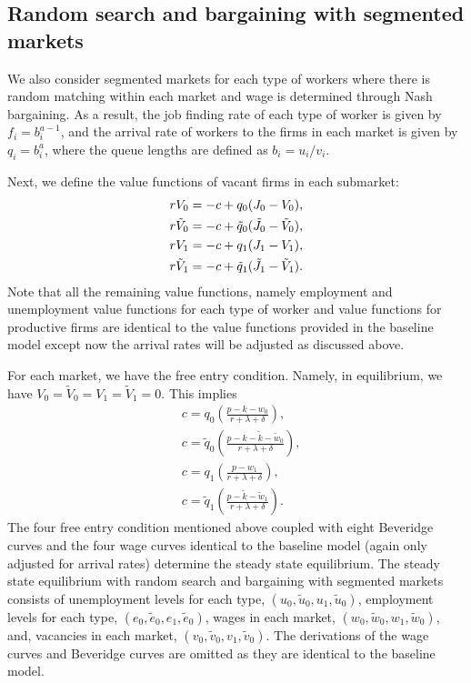 \documentclass[12pt]{article} %
\theoremstyle{definition}
\begin{document}
\begin{appendix}
\subsection{Random search and bargaining with segmented markets}
\label{section appendix random segmented}

We also consider segmented markets for each type of workers where there is random matching within each market and wage is determined through Nash bargaining. As a result, the job finding rate of each type of worker is given by $f_i=b_i^{a-1}$,
and the arrival rate of workers to the firms in each market is given by $q_i=b_i^a$,
where the queue lengths are defined as $b_i={u_i}/{v_i}$. 

Next, we define the value functions of vacant firms in each submarket:\\

\begin{align}
&rV_{0}=-c +q_0(J_0-V_0),  \notag \\
&r\tilde{V}_{0}= -c +\tilde{q}_0(\tilde{J}_0-\tilde{V}_0),  \notag\\
&rV_{1}= -c +q_1(J_1-V_1),\notag\\
&r\tilde{V}_1= -c +\tilde{q}_1(\tilde{J}_1-\tilde{V}_1).\notag
\end{align}
Note that all the remaining value functions, namely employment and unemployment value functions for each type of worker and value functions for productive firms are identical to the value functions provided in the baseline model except now the arrival rates will be adjusted as discussed above. 


For each market, we have the free entry condition. Namely, in equilibrium, we have $V_{0}=\tilde{V}_{0}=V_1=\tilde{V}_1=0$. This implies 
\begin{align*}
&c=q_0\left(\frac{p-k-w_0}{r+\lambda+\delta}\right), \\
&c=\tilde{q}_0\left(\frac{p-k-\tilde{k}-\tilde{w}_0}{r+\lambda+\delta}\right), \\
&c=q_1\left(\frac{p-w_1}{r+\lambda+\delta}\right),\\
&c=\tilde{q}_1\left(\frac{p-\tilde{k}-\tilde{w}_1}{r+\lambda+\delta}\right).
\end{align*}
The four free entry condition mentioned above coupled with eight Beveridge curves and the four wage curves identical to the baseline model (again only adjusted for arrival rates) determine the steady state equilibrium. The steady state equilibrium with random search and bargaining with segmented markets consists of unemployment levels for each type, $(u_0,\tilde{u}_0,u_1,\tilde{u}_0)$, employment levels for each type, $(e_0,\tilde{e}_0,e_1,\tilde{e}_0)$, wages in each market, $(w_0,\tilde{w}_0,w_1,\tilde{w}_0)$, and, vacancies in each market, $(v_0,\tilde{v}_0,v_1,\tilde{v}_0)$. The derivations of the wage curves and Beveridge curves are omitted as they are identical to the baseline model.


\end{appendix}
\end{document}
